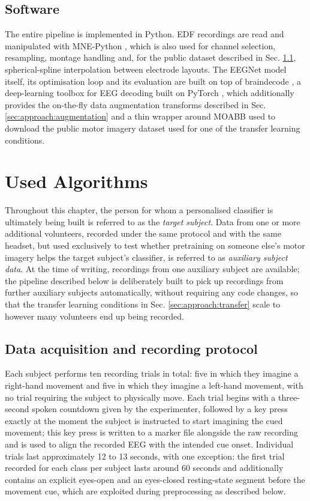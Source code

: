 \subsection{Software}
\label{sec:approach:software}

The entire pipeline is implemented in Python. EDF recordings are read and manipulated with MNE-Python \cite{gramfort-2013}, which is also used for channel selection, resampling, montage handling and, for the public dataset described in Sec. \ref{sec:approach:data}, spherical-spline interpolation between electrode layouts. The EEGNet model itself, its optimisation loop and its evaluation are built on top of braindecode \cite{schirrmeister-2017}, a deep-learning toolbox for EEG decoding built on PyTorch \cite{paszke-2019}, which additionally provides the on-the-fly data augmentation transforms described in Sec. \ref{sec:approach:augmentation} and a thin wrapper around MOABB \cite{jayaram-2018} used to download the public motor imagery dataset used for one of the transfer learning conditions.

\section{Used Algorithms}
\label{sec:approach:algo}

Throughout this chapter, the person for whom a personalised classifier is ultimately being built is referred to as the \emph{target subject}. Data from one or more additional volunteers, recorded under the same protocol and with the same headset, but used exclusively to test whether pretraining on someone else's motor imagery helps the target subject's classifier, is referred to as \emph{auxiliary subject data}. At the time of writing, recordings from one auxiliary subject are available; the pipeline described below is deliberately built to pick up recordings from further auxiliary subjects automatically, without requiring any code changes, so that the transfer learning conditions in Sec. \ref{sec:approach:transfer} scale to however many volunteers end up being recorded.

\subsection{Data acquisition and recording protocol}
\label{sec:approach:data}

Each subject performs ten recording trials in total: five in which they imagine a right-hand movement and five in which they imagine a left-hand movement, with no trial requiring the subject to physically move. Each trial begins with a three-second spoken countdown given by the experimenter, followed by a key press exactly at the moment the subject is instructed to start imagining the cued movement; this key press is written to a marker file alongside the raw recording and is used to align the recorded EEG with the intended cue onset. Individual trials last approximately 12 to 13 seconds, with one exception: the first trial recorded for each class per subject lasts around 60 seconds and additionally contains an explicit eyes-open and an eyes-closed resting-state segment before the movement cue, which are exploited during preprocessing as described below.


